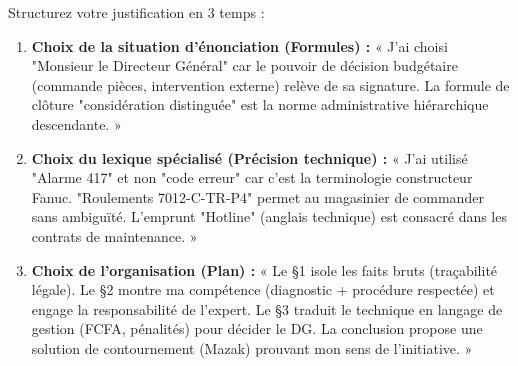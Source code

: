 \documentclass[11pt]{article}
\begin{document}
\begin{methode}
Structurez votre justification en 3 temps :
\begin{enumerate}
    \item \textbf{Choix de la situation d'énonciation (Formules) :} « J'ai choisi "Monsieur le Directeur Général" car le pouvoir de décision budgétaire (commande pièces, intervention externe) relève de sa signature. La formule de clôture "considération distinguée" est la norme administrative hiérarchique descendante. »
    \item \textbf{Choix du lexique spécialisé (Précision technique) :} « J'ai utilisé "Alarme 417" et non "code erreur" car c'est la terminologie constructeur Fanuc. "Roulements 7012-C-TR-P4" permet au magasinier de commander sans ambiguïté. L'emprunt "Hotline" (anglais technique) est consacré dans les contrats de maintenance. »
    \item \textbf{Choix de l'organisation (Plan) :} « Le §1 isole les faits bruts (traçabilité légale). Le §2 montre ma compétence (diagnostic + procédure respectée) et engage la responsabilité de l'expert. Le §3 traduit le technique en langage de gestion (FCFA, pénalités) pour décider le DG. La conclusion propose une solution de contournement (Mazak) prouvant mon sens de l'initiative. »
\end{enumerate}
\end{methode}
\end{document}
